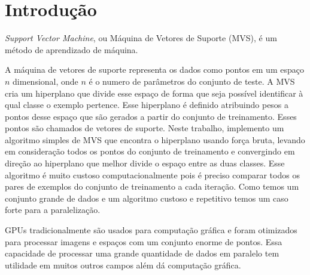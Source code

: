 \chapter{Introdução}\label{chp:LABEL_CHP_1}

\emph{Support Vector Machine}, ou Máquina de Vetores de Suporte (MVS), é um método de aprendizado de máquina. 




A máquina de vetores de suporte representa os dados como pontos em um espaço $n$ dimensional, onde $n$ é o numero de parâmetros do conjunto de teste. A MVS cria um hiperplano que divide esse espaço de forma que seja possível identificar à qual classe o exemplo pertence. Esse hiperplano é definido atribuindo pesos a pontos desse espaço que são gerados a partir do conjunto de treinamento. Esses pontos são chamados de vetores de suporte. Neste trabalho, implemento
um algoritmo simples de MVS que encontra o hiperplano usando força bruta, levando em consideração todos os pontos do conjunto de treinamento e convergindo em direção ao hiperplano que melhor divide o espaço entre as duas classes. Esse algoritmo é muito custoso computacionalmente pois é preciso comparar todos os pares de exemplos do conjunto de treinamento a cada iteração. 
Como temos um conjunto grande de dados e um algoritmo custoso e repetitivo temos um caso forte para a paralelização.


\par
GPUs tradicionalmente são usados para computação gráfica e foram otimizados para processar imagens e espaços com um conjunto enorme de pontos. Essa capacidade de processar uma grande quantidade de dados em paralelo tem utilidade em muitos outros campos além dá computação gráfica. 

